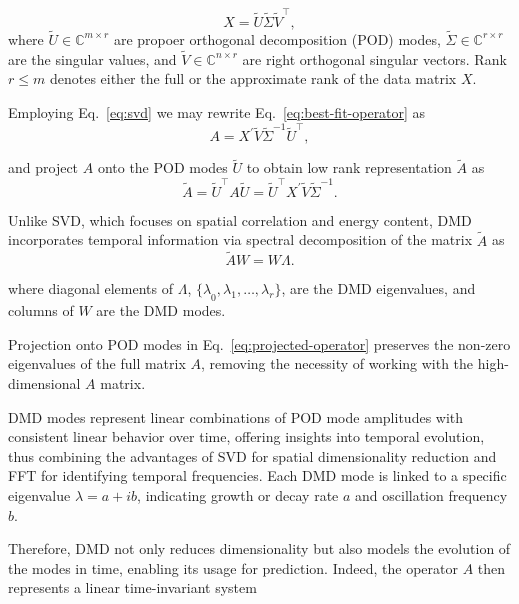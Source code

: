 \begin{equation}\label{eq:svd}
	X = \tilde{U} \tilde{\Sigma} \tilde{V}^\top,
\end{equation}
where \(\tilde{U} \in \mathbb{C}^{m \times r}\) are propoer orthogonal decomposition (POD) modes, \(\tilde{\Sigma} \in \mathbb{C}^{r \times r}\) are the singular values, and \( \tilde{V} \in \mathbb{C}^{n \times r}\) are right orthogonal singular vectors. Rank \(r \leq m\) denotes either the full or the approximate rank of the data matrix \(X\).

Employing Eq.~\ref{eq:svd} we may rewrite Eq.~\ref{eq:best-fit-operator} as
\begin{equation*}
	A = X^\prime \tilde{V} \tilde{\Sigma}^{-1} \tilde{U}^\top,
\end{equation*}

and project \(A\) onto the POD modes \(\tilde{U}\) to obtain low rank representation \(\tilde{A}\) as
\begin{equation}\label{eq:projected-operator}
	\tilde{A} = \tilde{U}^\top A \tilde{U} = \tilde{U}^\top X^\prime \tilde{V} \tilde{\Sigma}^{-1}.
\end{equation}

Unlike SVD, which focuses on spatial correlation and energy content, DMD incorporates temporal information via spectral decomposition of the matrix \(\tilde{A}\) as
\begin{equation}
	\tilde{A} W = W \Lambda.
\end{equation}

where diagonal elements of \(\Lambda \), \({\{\lambda}_0, {\lambda}_1, \ldots, {\lambda}_r\} \), are the DMD eigenvalues, and columns of \(W\) are the DMD modes.

Projection onto POD modes in Eq.~\ref{eq:projected-operator} preserves the non-zero eigenvalues of the full matrix \(A\), removing the necessity of working with the high-dimensional \(A\) matrix.

DMD modes represent linear combinations of POD mode amplitudes with consistent linear behavior over time, offering insights into temporal evolution, thus combining the advantages of SVD for spatial dimensionality reduction and FFT for identifying temporal frequencies. Each DMD mode is linked to a specific eigenvalue \(\lambda = a + ib\), indicating growth or decay rate \(a\) and oscillation frequency \(b\).

Therefore, DMD not only reduces dimensionality but also models the evolution of the modes in time, enabling its usage for prediction\citep{Brunton2022}. Indeed, the operator \(A\) then represents a linear time-invariant system

